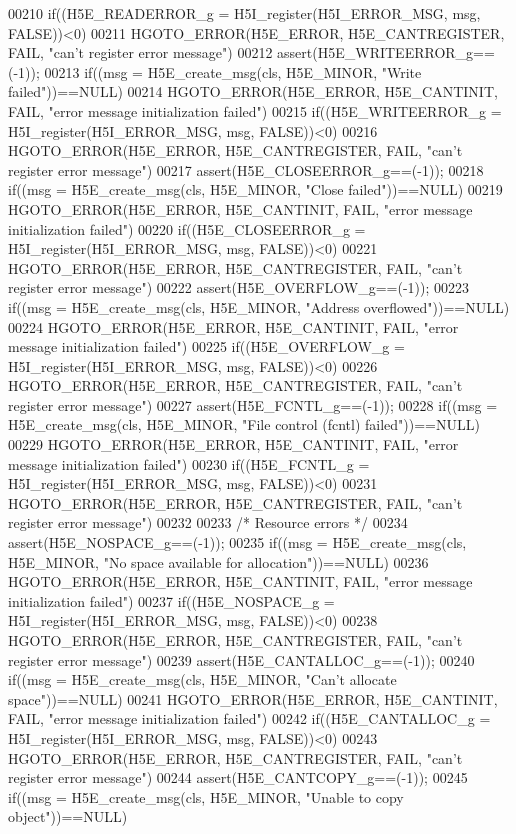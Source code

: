 \begin{DoxyCode}
00210 if((H5E\_READERROR\_g = H5I\_register(H5I\_ERROR\_MSG, msg, FALSE))<0)
00211     HGOTO\_ERROR(H5E\_ERROR, H5E\_CANTREGISTER, FAIL, "can't register error message")
00212 assert(H5E\_WRITEERROR\_g==(-1));
00213 if((msg = H5E\_create\_msg(cls, H5E\_MINOR, "Write failed"))==NULL)
00214     HGOTO\_ERROR(H5E\_ERROR, H5E\_CANTINIT, FAIL, "error message initialization failed")
00215 if((H5E\_WRITEERROR\_g = H5I\_register(H5I\_ERROR\_MSG, msg, FALSE))<0)
00216     HGOTO\_ERROR(H5E\_ERROR, H5E\_CANTREGISTER, FAIL, "can't register error message")
00217 assert(H5E\_CLOSEERROR\_g==(-1));
00218 if((msg = H5E\_create\_msg(cls, H5E\_MINOR, "Close failed"))==NULL)
00219     HGOTO\_ERROR(H5E\_ERROR, H5E\_CANTINIT, FAIL, "error message initialization failed")
00220 if((H5E\_CLOSEERROR\_g = H5I\_register(H5I\_ERROR\_MSG, msg, FALSE))<0)
00221     HGOTO\_ERROR(H5E\_ERROR, H5E\_CANTREGISTER, FAIL, "can't register error message")
00222 assert(H5E\_OVERFLOW\_g==(-1));
00223 if((msg = H5E\_create\_msg(cls, H5E\_MINOR, "Address overflowed"))==NULL)
00224     HGOTO\_ERROR(H5E\_ERROR, H5E\_CANTINIT, FAIL, "error message initialization failed")
00225 if((H5E\_OVERFLOW\_g = H5I\_register(H5I\_ERROR\_MSG, msg, FALSE))<0)
00226     HGOTO\_ERROR(H5E\_ERROR, H5E\_CANTREGISTER, FAIL, "can't register error message")
00227 assert(H5E\_FCNTL\_g==(-1));
00228 if((msg = H5E\_create\_msg(cls, H5E\_MINOR, "File control (fcntl) failed"))==NULL)
00229     HGOTO\_ERROR(H5E\_ERROR, H5E\_CANTINIT, FAIL, "error message initialization failed")
00230 if((H5E\_FCNTL\_g = H5I\_register(H5I\_ERROR\_MSG, msg, FALSE))<0)
00231     HGOTO\_ERROR(H5E\_ERROR, H5E\_CANTREGISTER, FAIL, "can't register error message")
00232 
00233 \textcolor{comment}{/* Resource errors */}
00234 assert(H5E\_NOSPACE\_g==(-1));
00235 if((msg = H5E\_create\_msg(cls, H5E\_MINOR, "No space available for allocation"))==NULL)
00236     HGOTO\_ERROR(H5E\_ERROR, H5E\_CANTINIT, FAIL, "error message initialization failed")
00237 if((H5E\_NOSPACE\_g = H5I\_register(H5I\_ERROR\_MSG, msg, FALSE))<0)
00238     HGOTO\_ERROR(H5E\_ERROR, H5E\_CANTREGISTER, FAIL, "can't register error message")
00239 assert(H5E\_CANTALLOC\_g==(-1));
00240 if((msg = H5E\_create\_msg(cls, H5E\_MINOR, "Can't allocate space"))==NULL)
00241     HGOTO\_ERROR(H5E\_ERROR, H5E\_CANTINIT, FAIL, "error message initialization failed")
00242 if((H5E\_CANTALLOC\_g = H5I\_register(H5I\_ERROR\_MSG, msg, FALSE))<0)
00243     HGOTO\_ERROR(H5E\_ERROR, H5E\_CANTREGISTER, FAIL, "can't register error message")
00244 assert(H5E\_CANTCOPY\_g==(-1));
00245 if((msg = H5E\_create\_msg(cls, H5E\_MINOR, "Unable to copy \textcolor{keywordtype}{object}"))==NULL)

\end{DoxyCode}
